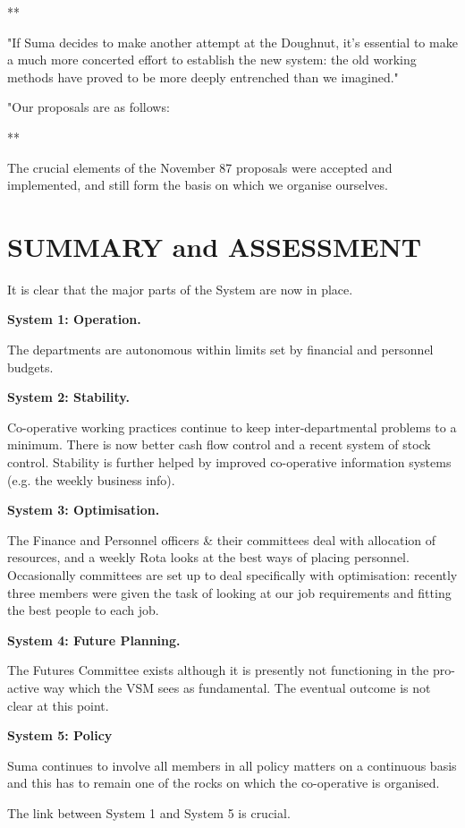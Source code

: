 **

"If Suma decides to make another attempt at the Doughnut, it's essential to make a much more concerted effort to establish the new system: the old working methods have proved to be more deeply entrenched than we imagined."

"Our proposals are as follows:

**

The crucial elements of the November 87 proposals were accepted and implemented, and still form the basis on which we organise ourselves.

\section*{SUMMARY and ASSESSMENT}
It is clear that the major parts of the System are now in place.

\textbf{System 1: Operation.}

The departments are autonomous within limits set by financial and personnel budgets.

\textbf{System 2: Stability.}

Co-operative working practices continue to keep inter-departmental problems to a minimum. There is now better cash flow control and a recent system of stock control. Stability is further helped by improved co-operative information systems (e.g. the weekly business info).

\textbf{System 3: Optimisation.}

The Finance and Personnel officers \& their committees deal with allocation of resources, and a weekly Rota looks at the best ways of placing personnel. Occasionally committees are set up to deal specifically with optimisation: recently three members were given the task of looking at our job requirements and fitting the best people to each job.

\textbf{System 4: Future Planning.}

The Futures Committee exists although it is presently not functioning in the pro-active way which the VSM sees as fundamental. The eventual outcome is not clear at this point.

\textbf{System 5: Policy}

Suma continues to involve all members in all policy matters on a continuous basis and this has to remain one of the rocks on which the co-operative is organised.

The link between System 1 and System 5 is crucial.

